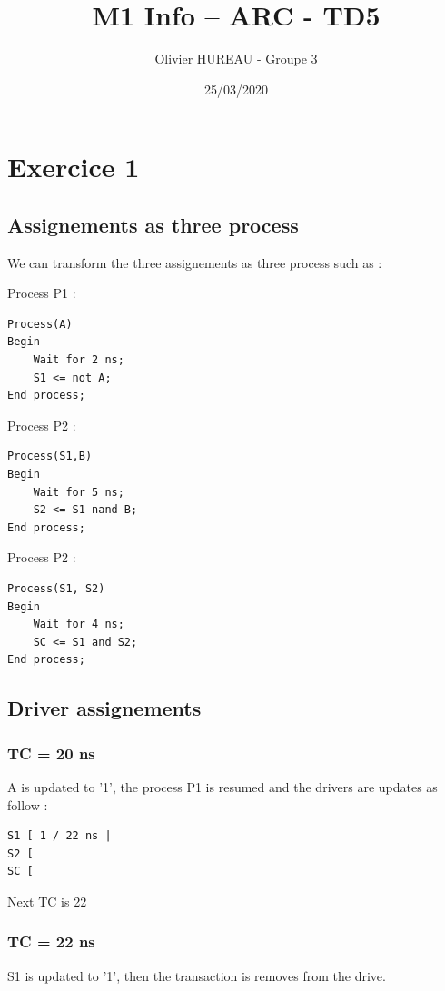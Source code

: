 \documentclass{article}
\title{M1 Info – ARC - TD5}
\author{Olivier HUREAU - Groupe 3}
\date{25/03/2020}
\begin{document}
\maketitle

\section{Exercice 1}

\subsection{Assignements as three process}

We can transform the three assignements as three process such as :

Process P1 :

\begin{verbatim}
Process(A)
Begin
	Wait for 2 ns;
	S1 <= not A;
End process;
\end{verbatim}

Process P2 : 

\begin{verbatim}
Process(S1,B)
Begin
	Wait for 5 ns;
	S2 <= S1 nand B;
End process;
\end{verbatim}

Process P2 :

\begin{verbatim}
Process(S1, S2)
Begin
	Wait for 4 ns;
	SC <= S1 and S2;
End process;
\end{verbatim}

\subsection{Driver assignements}

\subsubsection{TC = 20 ns}
A is updated to '1', the process P1 is resumed and the drivers are updates as follow : 

\begin{verbatim}
S1 [ 1 / 22 ns | 
S2 [
SC [
\end{verbatim}
Next TC is 22 


\subsubsection{TC = 22 ns}

S1 is updated to '1', then the transaction is removes from the drive.
\end{document}
